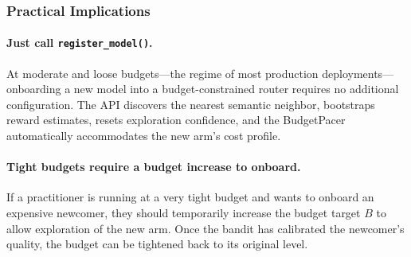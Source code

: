 \subsubsection{Practical Implications}

\paragraph{Just call \texttt{register\_model()}.}
At moderate and loose budgets---the regime of most production
deployments---onboarding a new model into a budget-constrained router
requires no additional configuration.  The API discovers the nearest
semantic neighbor, bootstraps reward estimates, resets exploration
confidence, and the BudgetPacer automatically accommodates the new
arm's cost profile.

\paragraph{Tight budgets require a budget increase to onboard.}
If a practitioner is running at a very tight budget and wants to
onboard an expensive newcomer, they should temporarily increase the
budget target $B$ to allow exploration of the new arm.  Once the bandit
has calibrated the newcomer's quality, the budget can be tightened back
to its original level.
